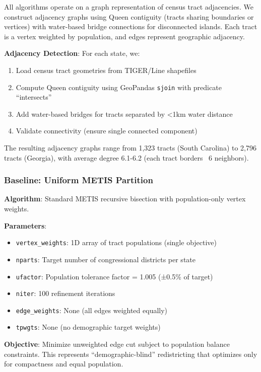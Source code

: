 All algorithms operate on a graph representation of census tract adjacencies. We construct adjacency graphs using Queen contiguity (tracts sharing boundaries or vertices) with water-based bridge connections for disconnected islands. Each tract is a vertex weighted by population, and edges represent geographic adjacency.

\textbf{Adjacency Detection}: For each state, we:
\begin{enumerate}
    \item Load census tract geometries from TIGER/Line shapefiles
    \item Compute Queen contiguity using GeoPandas \texttt{sjoin} with predicate ``intersects''
    \item Add water-based bridges for tracts separated by <1km water distance
    \item Validate connectivity (ensure single connected component)
\end{enumerate}

The resulting adjacency graphs range from 1,323 tracts (South Carolina) to 2,796 tracts (Georgia), with average degree 6.1-6.2 (each tract borders ~6 neighbors).

\subsubsection{Baseline: Uniform METIS Partition}

\textbf{Algorithm}: Standard METIS recursive bisection with population-only vertex weights.

\textbf{Parameters}:
\begin{itemize}
    \item \texttt{vertex\_weights}: 1D array of tract populations (single objective)
    \item \texttt{nparts}: Target number of congressional districts per state
    \item \texttt{ufactor}: Population tolerance factor = 1.005 (±0.5\% of target)
    \item \texttt{niter}: 100 refinement iterations
    \item \texttt{edge\_weights}: None (all edges weighted equally)
    \item \texttt{tpwgts}: None (no demographic target weights)
\end{itemize}

\textbf{Objective}: Minimize unweighted edge cut subject to population balance constraints. This represents ``demographic-blind'' redistricting that optimizes only for compactness and equal population.

